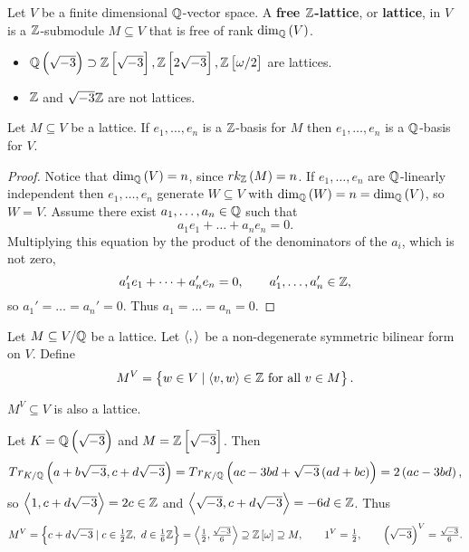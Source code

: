 
\begin{definition}
Let $ V $ be a finite dimensional $ \mathbb{Q} $-vector space. A \textbf{free $ \mathbb{Z} $-lattice}, or \textbf{lattice}, in $ V $ is a $ \mathbb{Z} $-submodule $ M \subseteq V $ that is free of rank $ \dim_\Q\br{V} $.
\end{definition}

\begin{example*}
\hfill
\begin{itemize}
\item $ \Q\br{\sqrt{-3}} \supset \Z\sbr{\sqrt{-3}}, \Z\sbr{2\sqrt{-3}}, \Z\sbr{\omega / 2} $ are lattices.
\item $ \mathbb{Z} $ and $ \sqrt{-3}\mathbb{Z} $ are not lattices.
\end{itemize}
\end{example*}

\begin{lemma}
Let $ M \subseteq V $ be a lattice. If $ e_1, \dots, e_n $ is a $ \mathbb{Z} $-basis for $ M $ then $ e_1, \dots, e_n $ is a $ \mathbb{Q} $-basis for $ V $.
\end{lemma}

\begin{proof}
Notice that $ \dim_\Q\br{V} = n $, since $ rk_\Z\br{M} = n $. If $ e_1, \dots, e_n $ are $ \mathbb{Q} $-linearly independent then $ e_1, \dots, e_n $ generate $ W \subseteq V $ with $ \dim_\Q\br{W} = n = \dim_\Q\br{V} $, so $ W = V $. Assume there exist $ a_1, \dots, a_n \in \mathbb{Q} $ such that
$$ a_1e_1 + \dots + a_ne_n = 0. $$
Multiplying this equation by the product of the denominators of the $ a_i $, which is not zero,
$$ a_1'e_1 + \dots + a_n'e_n = 0, \qquad a_1', \dots, a_n' \in \mathbb{Z}, $$
so $ a_1' = \dots = a_n' = 0 $. Thus $ a_1 = \dots = a_n = 0 $.
\end{proof}

\pagebreak

Let $ M \subseteq V / \mathbb{Q} $ be a lattice. Let $ \left\langle , \right\rangle $ be a non-degenerate symmetric bilinear form on $ V $. Define
$$ M^V = \cbr{w \in V \mid \abr{v, w} \in \Z \ \text{for all} \ v \in M}. $$

\begin{proposition}
\label{prop:duallattice}
$ M^V \subseteq V $ is also a lattice.
\end{proposition}

\begin{example*}
Let $ K = \Q\br{\sqrt{-3}} $ and $ M = \Z\sbr{\sqrt{-3}} $. Then
$$ Tr_{K / \Q}\br{a + b\sqrt{-3}, c + d\sqrt{-3}} = Tr_{K / \Q}\br{ac - 3bd + \sqrt{-3}\br{ad + bc}} = 2\br{ac - 3bd}, $$
so $ \left\langle 1, c + d\sqrt{-3} \right\rangle = 2c \in \mathbb{Z} $ and $ \left\langle \sqrt{-3}, c + d\sqrt{-3} \right\rangle = -6d \in \mathbb{Z} $. Thus
$$ M^V = \cbr{c + d\sqrt{-3} \mid c \in \tfrac{1}{2}\Z, \ d \in \tfrac{1}{6}\Z} = \abr{\tfrac{1}{2}, \tfrac{\sqrt{-3}}{6}} \supseteq \Z\sbr{\omega} \supseteq M, \qquad 1^V = \tfrac{1}{2}, \qquad \br{\sqrt{-3}}^V = \tfrac{\sqrt{-3}}{6}. $$
\end{example*}

